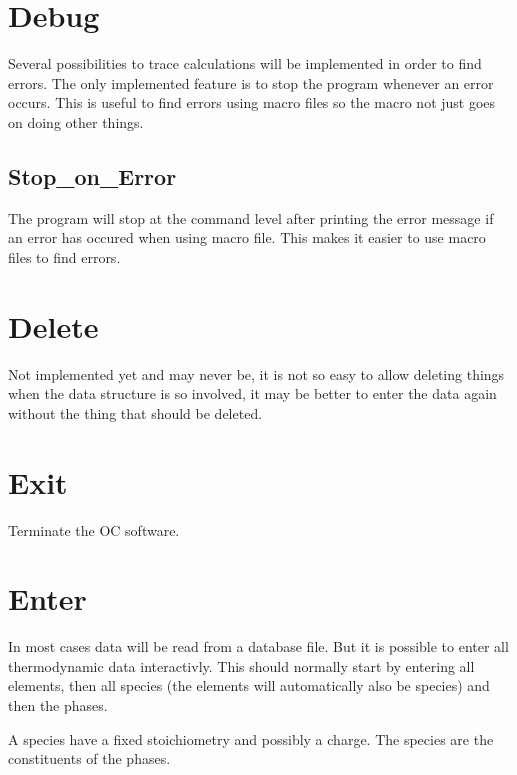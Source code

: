 \documentclass[12pt]{article}
\begin{document}
\section{Debug }

Several possibilities to trace calculations will be implemented in
order to find errors.  The only implemented feature is to stop the
program whenever an error occurs.  This is useful to find errors using
macro files so the macro not just goes on doing other things.

\subsection{Stop\_on\_Error}

The program will stop at the command level after printing the error
message if an error has occured when using macro file.  This makes it
easier to use macro files to find errors.

\section{Delete }

Not implemented yet and may never be, it is not so easy to allow
deleting things when the data structure is so involved, it may be
better to enter the data again without the thing that should be
deleted.

\section{Exit }

Terminate the OC software.

\section{Enter }

In most cases data will be read from a database file.  But it is
possible to enter all thermodynamic data interactivly.  This should
normally start by entering all elements, then all species (the
elements will automatically also be species) and then the phases.

A species have a fixed stoichiometry and possibly a charge.  The
species are the constituents of the phases.
\end{document}
